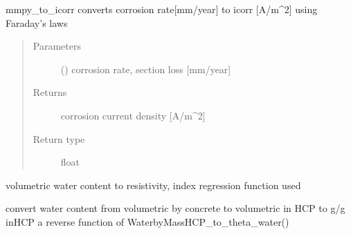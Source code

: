 \documentclass[letterpaper,10pt,english]{sphinxmanual}
\begin{document}
\begin{fulllineitems}
\label{\detokenize{corrosion:corrosion.mmpy_to_icorr}}
\sphinxAtStartPar
mmpy\_to\_icorr converts corrosion rate{[}mm/year{]} to icorr {[}A/m\textasciicircum{}2{]} using Faraday’s laws
\begin{quote}\begin{description}
\item[{Parameters}] \leavevmode
\sphinxAtStartPar
{} () \textendash{} corrosion rate, section loss {[}mm/year{]}

\item[{Returns}] \leavevmode
\sphinxAtStartPar
corrosion current density {[}A/m\textasciicircum{}2{]}

\item[{Return type}] \leavevmode
\sphinxAtStartPar
float

\end{description}\end{quote}

\end{fulllineitems}


\begin{fulllineitems}
\label{\detokenize{corrosion:corrosion.theta2rho_fun}}
\sphinxAtStartPar
volumetric water content to resistivity, index regression function used

\end{fulllineitems}


\begin{fulllineitems}
\label{\detokenize{corrosion:corrosion.theta_water_to_WaterbyMassHCP}}
\sphinxAtStartPar
convert water content from volumetric by concrete to volumetric in HCP  to g/g  inHCP
a reverse function of WaterbyMassHCP\_to\_theta\_water()

\end{fulllineitems}
\end{document}
